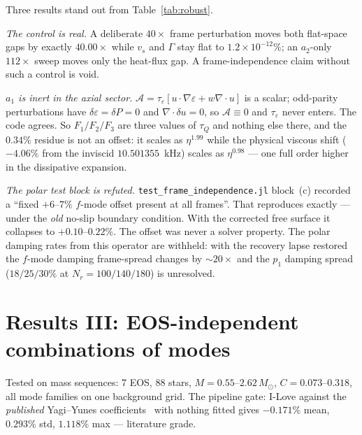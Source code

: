 \documentclass[aps,prd,preprint,amsmath,amssymb,nofootinbib,longbibliography]{revtex4-2}
\newcommand{\Msun}{M_\odot}
\begin{document}
Three results stand out from Table~\ref{tab:robust}.

\emph{The control is real.} A deliberate $40\times$ frame perturbation moves both flat-space gaps
by exactly $40.00\times$ while $v_s$ and $\Gamma$ stay flat to $1.2\times10^{-12}\%$; an
$a_2$-only $112\times$ sweep moves only the heat-flux gap. A frame-independence claim without
such a control is void.

\emph{$a_1$ is inert in the axial sector.} $\mathcal A = \tau_\varepsilon[u\cdot\nabla\varepsilon
+ w\nabla\cdot u]$ is a scalar; odd-parity perturbations have $\delta\varepsilon = \delta P = 0$
and $\nabla\cdot\delta u = 0$, so $\mathcal A\equiv0$ and $\tau_\varepsilon$ never enters. The
code agrees. So $F_1/F_2/F_3$ are three values of $\tau_Q$ and nothing else there, and the
$0.34\%$ residue is not an offset: it scales as $\eta^{1.99}$ while the physical viscous shift
($-4.06\%$ from the inviscid $10.501355$~kHz) scales as $\eta^{0.98}$ --- one full order higher
in the dissipative expansion.

\emph{The polar test block is refuted.} \texttt{test\_frame\_independence.jl} block~(c) recorded a
``fixed $+6$--$7\%$ $f$-mode offset present at all frames''. That reproduces exactly --- under
the \emph{old} no-slip boundary condition. With the corrected free surface it collapses to
$+0.10$--$0.22\%$. The offset was never a solver property. The polar damping rates from this
operator are withheld: with the recovery lapse restored the $f$-mode damping frame-spread changes
by $\sim20\times$ and the $p_1$ damping spread ($18/25/30\%$ at $N_r = 100/140/180$) is unresolved.

\section{Results III: EOS-independent combinations of modes}
\label{sec:universal}

Tested on mass sequences: 7 EOS, 88 stars, $M = 0.55$--$2.62\,\Msun$, $C = 0.073$--$0.318$, all
mode families on one background grid. The pipeline gate: I-Love against the \emph{published}
Yagi--Yunes coefficients~\cite{YagiYunes2013} with nothing fitted gives $-0.171\%$ mean,
$0.293\%$ std, $1.118\%$ max --- literature grade.
\end{document}
